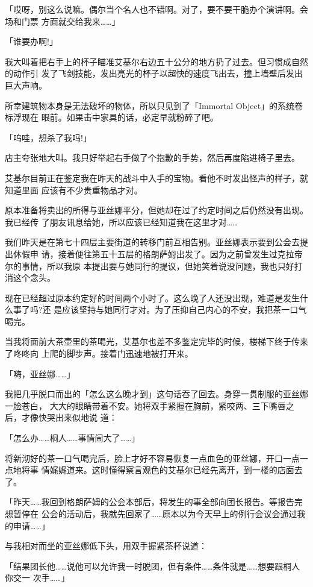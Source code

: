 \documentclass[11pt]{book}
\begin{document}
「哎呀，别这么说嘛。偶尔当个名人也不错啊。对了，要不要干脆办个演讲啊。会场和门票
方面就交给我来……」

「谁要办啊!」

我大叫着把右手上的杯子瞄准艾基尔右边五十公分的地方扔了过去。但习惯成自然的动作引
发了飞剑技能，发出亮光的杯子以超快的速度飞出去，撞上墙壁后发出巨大声响。

所幸建筑物本身是无法破坏的物体，所以只见到了「Immortal Object」的系统卷标浮现在
眼前。如果击中家具的话，必定早就粉碎了吧。

「呜哇，想杀了我吗!」

店主夸张地大叫。我只好举起右手做了个抱歉的手势，然后再度陷进椅子里去。

艾基尔目前正在鉴定我在昨天的战斗中入手的宝物。看他不时发出怪声的样子，就知道里面
应该有不少贵重物品才对。

原本准备将卖出的所得与亚丝娜平分，但她却在过了约定时间之后仍然没有出现。我已经传
了朋友讯息给她，所以应该已经知道我在这里才对……

我们昨天是在第七十四层主要街道的转移门前互相告别。亚丝娜表示要到公会去提出休假申
请，接着便往第五十五层的格朗萨姆出发了。因为之前曾发生过克拉帝尔的事情，所以我原
本提出要与她同行的提议，但她笑着说没问题，我也只好打消这个念头。

现在已经超过原本约定好的时间两个小时了。这么晚了人还没出现，难道是发生什么事了吗?还
是应该坚持与她同行才对。为了压抑自己内心的不安，我把茶一口气喝完。

当我将面前大茶壶里的茶喝光，艾基尔也差不多鉴定完毕的时候，楼梯下终于传来了咚咚向
上爬的脚步声。接着门迅速地被打开来。

「嗨，亚丝娜……」

我把几乎脱口而出的「怎么这么晚才到」这句话吞了回去。身穿一贯制服的亚丝娜一脸苍白，
大大的眼睛带着不安。她将双手紧握在胸前，紧咬两、三下嘴唇之后，才像快哭出来似地说
道：

「怎么办……桐人……事情闹大了……」

将新沏好的茶一口气喝完后，脸上才好不容易恢复一点血色的亚丝娜，开口一点一点地将事
情娓娓道来。这时懂得察言观色的艾基尔已经先离开，到一楼的店面去了。

「昨天……我回到格朗萨姆的公会本部后，将发生的事全部向团长报告。等报告完想暂停在
公会的活动后，我就先回家了……原本以为今天早上的例行会议会通过我的申请……」

与我相对而坐的亚丝娜低下头，用双手握紧茶杯说道：

「结果团长他……说他可以允许我一时脱团，但有条件……条件就是……想要跟桐人你交一
次手……」
\end{document}
